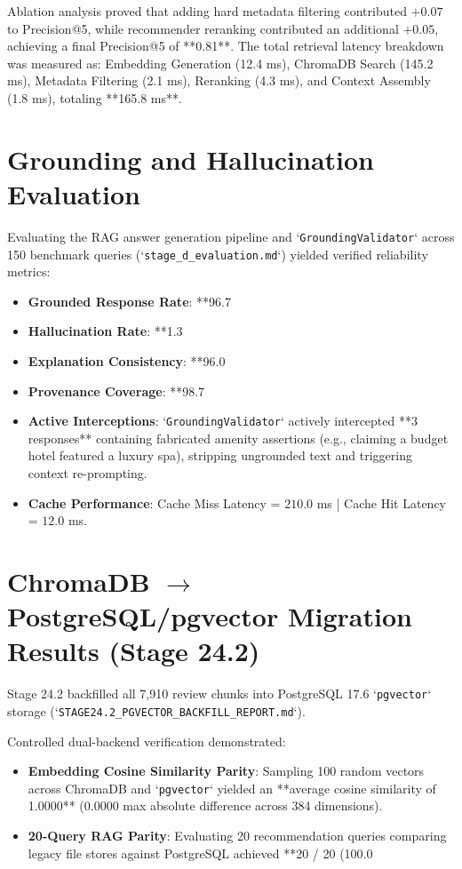 Ablation analysis proved that adding hard metadata filtering contributed $+0.07$ to Precision@5, while recommender reranking contributed an additional $+0.05$, achieving a final Precision@5 of **0.81**. The total retrieval latency breakdown was measured as: Embedding Generation (12.4 ms), ChromaDB Search (145.2 ms), Metadata Filtering (2.1 ms), Reranking (4.3 ms), and Context Assembly (1.8 ms), totaling **165.8 ms**.

\section{Grounding and Hallucination Evaluation}
Evaluating the RAG answer generation pipeline and `\texttt{GroundingValidator}` across 150 benchmark queries (`\texttt{stage\_d\_evaluation.md}`) yielded verified reliability metrics:
\begin{itemize}
    \item \textbf{Grounded Response Rate}: **96.7%
    \item \textbf{Hallucination Rate}: **1.3%
    \item \textbf{Explanation Consistency}: **96.0%
    \item \textbf{Provenance Coverage}: **98.7%
    \item \textbf{Active Interceptions}: `\texttt{GroundingValidator}` actively intercepted **3 responses** containing fabricated amenity assertions (e.g., claiming a budget hotel featured a luxury spa), stripping ungrounded text and triggering context re-prompting.
    \item \textbf{Cache Performance}: Cache Miss Latency = $210.0$ ms | Cache Hit Latency = $12.0$ ms.
\end{itemize}

\section{ChromaDB $\rightarrow$ PostgreSQL/pgvector Migration Results (Stage 24.2)}
Stage 24.2 backfilled all 7,910 review chunks into PostgreSQL 17.6 `\texttt{pgvector}` storage (`\texttt{STAGE24.2\_PGVECTOR\_BACKFILL\_REPORT.md}`).

Controlled dual-backend verification demonstrated:
\begin{itemize}
    \item \textbf{Embedding Cosine Similarity Parity}: Sampling 100 random vectors across ChromaDB and `\texttt{pgvector}` yielded an **average cosine similarity of 1.0000** ($0.0000$ max absolute difference across 384 dimensions).
    \item \textbf{20-Query RAG Parity}: Evaluating 20 recommendation queries comparing legacy file stores against PostgreSQL achieved **20 / 20 (100.0%
\end{itemize}

